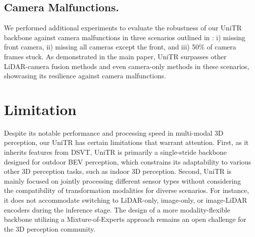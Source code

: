 \documentclass[10pt,twocolumn,letterpaper]{article}
\begin{document}
\subsection{Camera Malfunctions.} We performed additional experiments to evaluate the robustness of our UniTR backbone against camera malfunctions in three scenarios outlined in \cite{liang2022bevfusion}: i) missing front camera, ii) missing all cameras except the front, and iii) 50\% of camera frames stuck. As demonstrated in the main paper, UniTR surpasses other LiDAR-camera fusion methods and even camera-only methods in these scenarios, showcasing its resilience against camera malfunctions.

\section{Limitation} \label{sec:limit}
Despite its notable performance and processing speed in multi-modal 3D perception, our UniTR has certain limitations that warrant attention. First, as it inherits features from DSVT, UniTR is primarily a single-stride backbone designed for outdoor BEV perception, which constrains its adaptability to various other 3D perception tasks, such as indoor 3D perception. Second, UniTR is mainly focused on jointly processing different sensor types without considering the compatibility of transformation modalities for diverse scenarios. For instance, it does not accommodate switching to LiDAR-only, image-only, or image-LiDAR encoders during the inference stage. The design of a more modality-flexible backbone utilizing a Mixture-of-Experts approach remains an open challenge for the 3D perception community.
\end{document}

